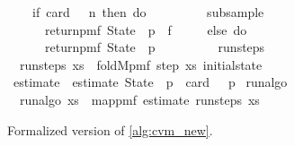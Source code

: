 \begin{figure}[t]
\begin{isabelle_cm}
\isanewline
\ \ \ \ if\ card\ {\isasymchi}\ {\isacharequal}{\kern0pt}\ n\ then\ do\ {\isacharbraceleft}{\kern0pt}\isanewline
\ \ \ \ \ \ {\isasymchi}\ {\isasymleftarrow}\ subsample\ {\isasymchi}{\isacharsemicolon}{\kern0pt}\isanewline
\ \ \ \ \ \ return{\isacharunderscore}{\kern0pt}pmf\ {\isacharparenleft}{\kern0pt}State\ {\isasymchi}\ {\isacharparenleft}{\kern0pt}p\ {\isacharasterisk}{\kern0pt}\ f{\isacharparenright}{\kern0pt}{\isacharparenright}{\kern0pt}\isanewline
\ \ \ \ {\isacharbraceright}{\kern0pt}\ else\ do\ {\isacharbraceleft}{\kern0pt}\isanewline
\ \ \ \ \ \ return{\isacharunderscore}{\kern0pt}pmf\ {\isacharparenleft}{\kern0pt}State\ {\isasymchi}\ p{\isacharparenright}{\kern0pt}\isanewline
\ \ \ \ {\isacharbraceright}{\kern0pt}\isanewline
\ \ \ {\isacharbraceright}{\kern0pt}{\isacartoucheclose}\isanewline
\isanewline
{}\isamarkupfalse%
\ run{\isacharunderscore}{\kern0pt}steps\ \ %
\hfill{}\isanewline
\ \ {\isacartoucheopen}run{\isacharunderscore}{\kern0pt}steps\ xs\ {\isacharequal}{\kern0pt}\ foldM{\isacharunderscore}{\kern0pt}pmf\ step\ xs\ initial{\isacharunderscore}{\kern0pt}state{\isacartoucheclose}\isanewline
{}\isamarkupfalse%
\ estimate\ \
{\isacartoucheopen}estimate\ {\isacharparenleft}{\kern0pt}State\ {\isasymchi}\ p{\isacharparenright}{\kern0pt}\ {\isacharequal}{\kern0pt}\ card\ {\isasymchi}\ {\isacharslash}{\kern0pt}\ p{\isacartoucheclose}\isanewline
\isacommand{fun}\isamarkupfalse%
\ run{\isacharunderscore}{\kern0pt}algo\ \ %
\hfill{}\isanewline
\ \ {\isacartoucheopen}run{\isacharunderscore}{\kern0pt}algo\ xs\ {\isacharequal}{\kern0pt}\ map{\isacharunderscore}{\kern0pt}pmf\ estimate\ {\isacharparenleft}{\kern0pt}run{\isacharunderscore}{\kern0pt}steps\ xs{\isacharparenright}{\kern0pt}{\isacartoucheclose}\isanewline
{\normalfont [\dots]}\isanewline
{}
\end{isabelle_cm}
\caption{Formalized version of \cref{alg:cvm_new}.}\label{alg:cvm_formalized}
\end{figure}

